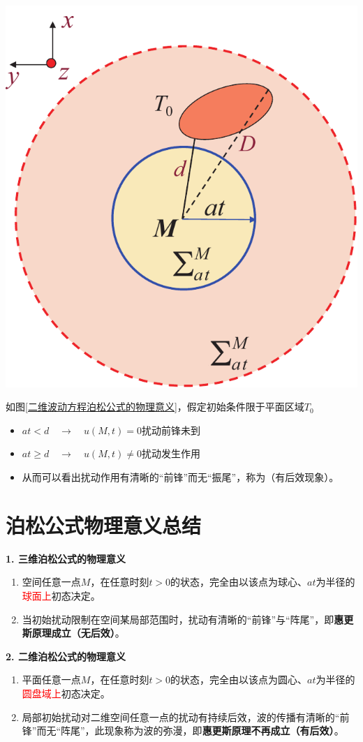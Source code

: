 \begin{minipage}{0.4\linewidth}
	\centering
	\includegraphics[width=0.7\linewidth]{pic/二维泊松物理意义.pdf}
	\vspace*{-1em}
	\label{二维波动方程泊松公式的物理意义}
\end{minipage}
\begin{minipage}{0.6\linewidth}
	如图\ref{二维波动方程泊松公式的物理意义}，假定初始条件限于平面区域$T_0$
	\begin{itemize}
		\item $at < d\quad \to \quad u(M,t) = 0$\quad 扰动前锋未到
		\item $at \ge d\quad \to \quad u(M,t) \neq 0$\quad 扰动发生作用
		\item 从而可以看出扰动作用有清晰的“前锋”而无“振尾”，称为（有后效现象）。
	\end{itemize}
\end{minipage}

\section{泊松公式物理意义总结}
\noindent \textbf{1. 三维泊松公式的物理意义}
\begin{enumerate}[\hspace*{2em} (1) ]
	\item 空间任意一点$M$，在任意时刻$t>0$的状态，完全由以该点为球心、$at$为半径的\textcolor{red}{球面上}初态决定。
	\item 当初始扰动限制在空间某局部范围时，扰动有清晰的“前锋”与“阵尾”，即\textbf{惠更斯原理成立（无后效）}。
\end{enumerate}

\noindent \textbf{2. 二维泊松公式的物理意义}
\begin{enumerate}[\hspace*{2em} (1) ]
	\item 平面任意一点$M$，在任意时刻$t>0$的状态，完全由以该点为圆心、$at$为半径的\textcolor{red}{圆盘域上}初态决定。
	\item 局部初始扰动对二维空间任意一点的扰动有持续后效，波的传播有清晰的“前锋”而无“阵尾”，此现象称为波的弥漫，即\textbf{惠更斯原理不再成立（有后效）}。
\end{enumerate}

















